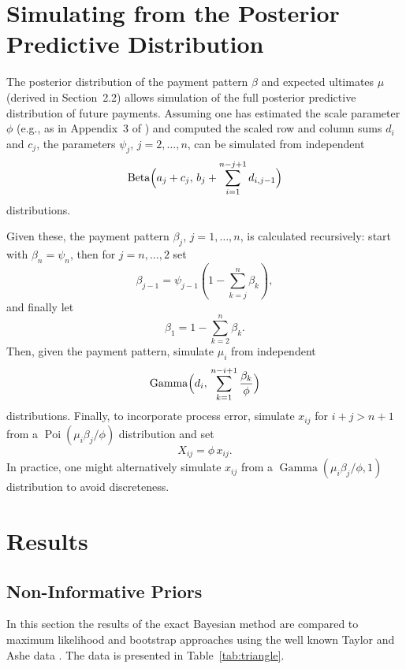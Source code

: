 \documentclass[aps,pre,draft]{revtex4-2}
\begin{document}
\section{Simulating from the Posterior Predictive Distribution}

The posterior distribution of the payment pattern $\beta$ and expected ultimates $\mu$ (derived in Section~2.2) allows simulation of the full posterior predictive distribution of future payments. Assuming one has estimated the scale parameter $\phi$ (e.g., as in Appendix~3 of \cite{england2006predictive}) 
and computed the scaled row and column sums $d_i$ and $c_j$, the parameters $\psi_j$, $j=2,\dots,n$, can be simulated from independent
\[
\operatorname{Beta}\Bigl(a_j+c_j,\,b_j+\sum_{i=1}^{n-j+1}d_{i,j-1}\Bigr)
\]
distributions.

Given these, the payment pattern $\beta_j$, $j=1,\dots,n$, is calculated recursively: start with $\beta_n=\psi_n$, then for $j=n,\dots,2$ set
\[
\beta_{j-1}=\psi_{j-1}\left(1-\sum_{k=j}^{n}\beta_k\right),
\]
and finally let
\[
\beta_1=1-\sum_{k=2}^{n}\beta_k.
\]
Then, given the payment pattern, simulate $\mu_i$ from independent
\[
\operatorname{Gamma}\Bigl(d_i,\,\sum_{k=1}^{n-i+1}\frac{\beta_k}{\phi}\Bigr)
\]
distributions. Finally, to incorporate process error, simulate $x_{ij}$ for $i+j>n+1$ from a $\operatorname{Poi}(\mu_i\beta_j/\phi)$ distribution and set
\[
X_{ij}=\phi\,x_{ij}.
\]
In practice, one might alternatively simulate $x_{ij}$ from a $\operatorname{Gamma}(\mu_i\beta_j/\phi,1)$ distribution to avoid discreteness.

\section{Results}

\subsection{Non-Informative Priors}

In this section the results of the exact Bayesian method are compared to maximum likelihood and bootstrap approaches 
using the well known Taylor and Ashe data \cite{taylor1983second}. The data is presented in Table~\ref{tab:triangle}.
\end{document}
